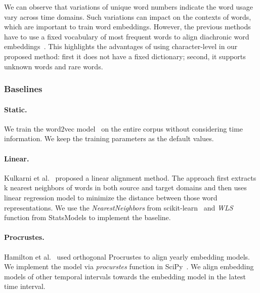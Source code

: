 We can observe that variations of unique word numbers indicate the word usage vary across time domains. 
Such variations can impact on the contexts of words, which are important to train word embeddings.
However, the previous methods have to use a fixed vocabulary of most frequent words to align diachronic word embeddings~\cite{kulkarni2015statistically, hamilton2016diachronic}.
This highlights the advantages of using character-level in our proposed method: first it does not have a fixed dictionary; second, it supports unknown words and rare words.

\subsubsection{Baselines}
\label{chap3:subsec:dweBaselines}


\paragraph{Static.} We train the word2vec model~\cite{mikolov2013distributed} on the entire corpus without considering time information.
We keep the training parameters as the default values.

\paragraph{Linear.} Kulkarni et al.~\cite{kulkarni2015statistically} proposed a linear alignment method. The approach first extracts k nearest neighbors of words in both source and target domains and then uses linear regression model to minimize the distance between those word representations. We use the \textit{NearestNeighbors} from scikit-learn~\cite{pedregosa2011scikit} and \textit{WLS} function from StatsModels to implement the baseline.

\paragraph{Procrustes.} Hamilton et al.~\cite{hamilton2016diachronic} used orthogonal Procrustes to align yearly embedding models. We implement the model via \textit{procurstes} function in SciPy~\cite{scipy_2001}. We align embedding models of other temporal intervals towards the embedding model in the latest time interval.

